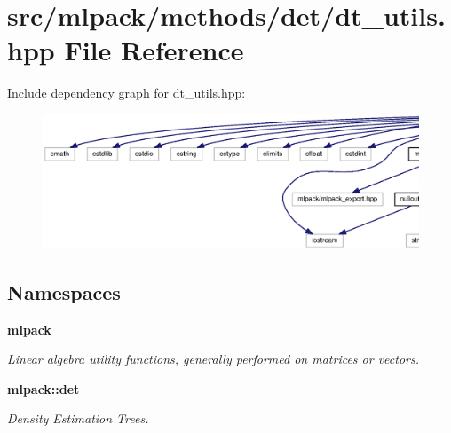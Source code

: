 \section{src/mlpack/methods/det/dt\+\_\+utils.hpp File Reference}
\label{dt__utils_8hpp}
Include dependency graph for dt\+\_\+utils.\+hpp\+:
\nopagebreak
\begin{figure}[H]
\begin{center}
\leavevmode
\includegraphics[width=350pt]{dt__utils_8hpp__incl}
\end{center}
\end{figure}
\subsection*{Namespaces}
\begin{DoxyCompactItemize}
\item 
 {\bf mlpack}
\begin{DoxyCompactList}\small\item\em Linear algebra utility functions, generally performed on matrices or vectors. \end{DoxyCompactList}\item 
 {\bf mlpack\+::det}
\begin{DoxyCompactList}\small\item\em Density Estimation Trees. \end{DoxyCompactList}\end{DoxyCompactItemize}
